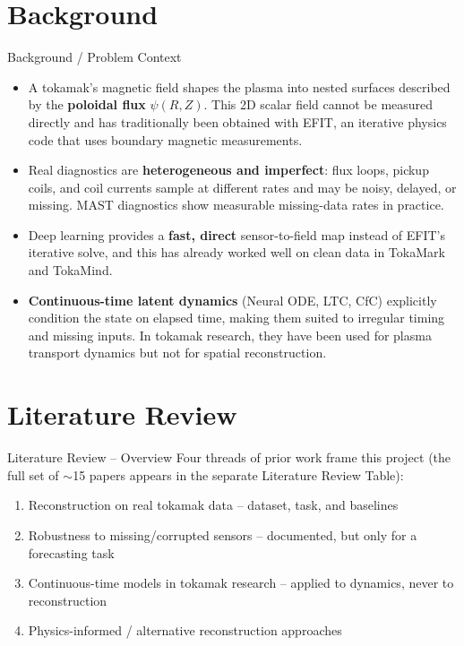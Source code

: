 \documentclass[aspectratio=169]{beamer}
\begin{document}
\section{Background}
\begin{frame}{Background / Problem Context}
  \begin{itemize}
    \item A tokamak's magnetic field shapes the plasma into nested surfaces
      described by the \textbf{poloidal flux} $\psi(R,Z)$. This 2D scalar
      field cannot be measured directly and has traditionally been obtained
      with EFIT, an iterative physics code that uses boundary magnetic
      measurements.
    \item Real diagnostics are \textbf{heterogeneous and imperfect}: flux
      loops, pickup coils, and coil currents sample at different rates and
      may be noisy, delayed, or missing. MAST diagnostics show measurable
      missing-data rates in practice.
    \item Deep learning provides a \textbf{fast, direct} sensor-to-field map
      instead of EFIT's iterative solve, and this has already worked well on
      clean data in TokaMark and TokaMind.
    \item \textbf{Continuous-time latent dynamics} (Neural ODE, LTC, CfC)
      explicitly condition the state on elapsed time, making them suited to
      irregular timing and missing inputs. In tokamak research, they have
      been used for plasma transport dynamics but not for spatial
      reconstruction.
  \end{itemize}
\end{frame}

\section{Literature Review}
\begin{frame}{Literature Review -- Overview}
  Four threads of prior work frame this project (the full set of $\sim$15
  papers appears in the separate Literature Review Table):
  \begin{enumerate}
    \item[\textbf{A.}] Reconstruction on real tokamak data -- dataset, task, and baselines
    \item[\textbf{B.}] Robustness to missing/corrupted sensors -- documented, but only for a forecasting task
    \item[\textbf{C.}] Continuous-time models in tokamak research -- applied to dynamics, never to reconstruction
    \item[\textbf{D.}] Physics-informed / alternative reconstruction approaches
  \end{enumerate}
\end{frame}
\end{document}
